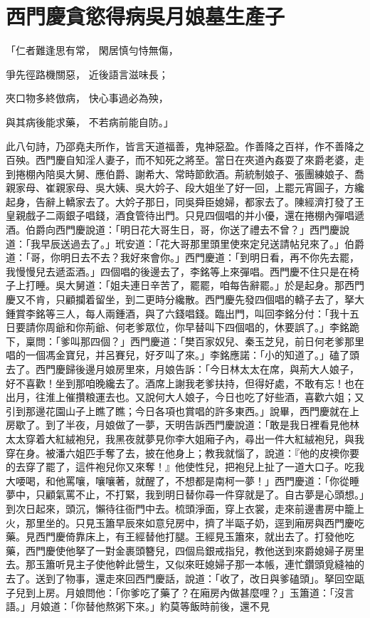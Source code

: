 %

\chapter{西門慶貪慾得病\KG 吳月娘墓生產子}

「仁者難逢思有常，  閑居慎勻恃無傷，

爭先徑路機關惡，  近後語言滋味長；

夾口物多終倣病，  快心事過必為殃，

與其病後能求藥，  不若病前能自防。」

此八句詩，乃邵堯夫所作，皆言天道福善，鬼神惡盈。作善降之百祥，作不善降之百殃。西門慶自知淫人妻子，而不知死之將至。當日在夾道內姦耍了來爵老婆，走到捲棚內陪吳大舅、應伯爵、謝希大、常時節飲酒。荊統制娘子、張團練娘子、喬親家母、崔親家母、吳大姨、吳大妗子、段大姐坐了好一回，上罷元宵圓子，方纔起身，告辭上轎家去了。大妗子那日，同吳舜臣媳婦，都家去了。陳經濟打發了王皇親戲子二兩銀子唱錢，酒食管待出門。只見四個唱的并小優，還在捲棚內彈唱遞酒。伯爵向西門慶說道：「明日花大哥生日，哥，你送了禮去不曾？」西門慶說道：「我早辰送過去了。」玳安道：「花大哥那里頭里使來定兒送請帖兒來了。」伯爵道：「哥，你明日去不去？我好來會你。」西門慶道：「到明日看，再不你先去罷，我慢慢兒去遞盃酒。」四個唱的後邊去了，李銘等上來彈唱。西門慶不住只是在椅子上打睡。吳大舅道：「姐夫連日辛苦了，罷罷，咱每告辭罷。」於是起身。那西門慶又不肯，只顧攔着留坐，到二更時分纔散。西門慶先發四個唱的轎子去了，拏大鍾賞李銘等三人，每人兩鍾酒，與了六錢唱錢。臨出門，叫回李銘分付：「我十五日要請你周爺和你荊爺、何老爹眾位，你早替叫下四個唱的，休要誤了。」李銘跪下，稟問：「爹叫那四個？」西門慶道：「樊百家奴兒、秦玉芝兒，前日何老爹那里唱的一個馮金寶兒，并呂賽兒，好歹叫了來。」李銘應諾：「小的知道了。」磕了頭去了。西門慶歸後邊月娘房里來，月娘告訴：「今日林太太在席，與荊大人娘子，好不喜歡！坐到那咱晚纔去了。酒席上謝我老爹扶持，但得好處，不敢有忘！也在出月，往淮上催攢粮運去也。又說何大人娘子，今日也吃了好些酒，喜歡六姐；又引到那邊花園山子上瞧了瞧；今日各項也賞唱的許多東西。」說畢，西門慶就在上房歇了。到了半夜，月娘做了一夢，天明告訴西門慶說道：「敢是我日裡看見他林太太穿着大紅絨袍兒，我黑夜就夢見你李大姐廂子內，尋出一件大紅絨袍兒，與我穿在身。被潘六姐匹手奪了去，披在他身上；教我就惱了，說道：『他的皮襖你要的去穿了罷了，這件袍兒你又來奪！』他使性兒，把袍兒上扯了一道大口子。吃我大喓喝，和他罵嚷，嚷嚷著，就醒了，不想都是南柯一夢！」西門慶道：「你從睡夢中，只顧氣罵不止，不打緊，我到明日替你尋一件穿就是了。自古夢是心頭想。」到次日起來，頭沉，懶待往衙門中去。梳頭淨面，穿上衣裳，走來前邊書房中籠上火，那里坐的。只見玉簫早辰來如意兒房中，擠了半甌子奶，逕到廂房與西門慶吃藥。見西門慶倚靠床上，有王經替他打腿。王經見玉簫來，就出去了。打發他吃藥，西門慶使他拏了一對金裹頭簪兒，四個烏銀戒指兒，教他送到來爵媳婦子房里去。那玉簫听見主子使他幹此營生，又似來旺媳婦子那一本帳，連忙鑽頭覓縫袖的去了。送到了物事，還走來回西門慶話，說道：「收了，改日與爹磕頭」。拏回空甌子兒到上房。月娘問他：「你爹吃了藥了？在廂房內做甚麼哩？」玉簫道：「沒言語。」月娘道：「你替他熬粥下來。」約莫等飯時前後，還不見